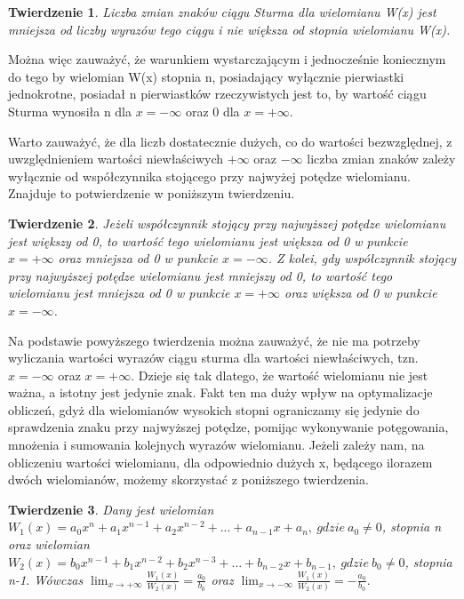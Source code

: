 \documentclass[twoside,a4paper]{book}
\newtheorem{theorem}{Twierdzenie}
\begin{document}
\begin{theorem}
	Liczba zmian znaków ciągu Sturma dla wielomianu W(x) jest mniejsza od liczby wyrazów tego ciągu i nie większa od stopnia wielomianu W(x).
\end{theorem}

Można więc zauważyć, że warunkiem wystarczającym i jednocześnie koniecznym do tego by wielomian W(x) stopnia n, posiadający wyłącznie pierwiastki jednokrotne, posiadał n pierwiastków rzeczywistych jest to, by wartość ciągu Sturma wynosiła n dla $x=-\infty$ oraz 0 dla $x=+\infty$. 

Warto zauważyć, że dla liczb dostatecznie dużych, co do wartości bezwzględnej, z uwzględnieniem wartości niewłaściwych $+\infty$ oraz $-\infty$ liczba zmian znaków zależy wyłącznie od współczynnika stojącego przy najwyżej potędze wielomianu. Znajduje to potwierdzenie w poniższym twierdzeniu.

\begin{theorem}
	Jeżeli współczynnik stojący przy najwyższej potędze wielomianu jest większy od 0, to wartość tego wielomianu jest większa od 0 w punkcie $x=+\infty$ oraz mniejsza od 0 w punkcie $x=-\infty$.
	Z kolei, gdy współczynnik stojący przy najwyższej potędze wielomianu jest mniejszy od 0, to wartość tego wielomianu jest mniejsza od 0 w punkcie $x=+\infty$ oraz większa od 0 w punkcie $x=-\infty$.
\end{theorem}

Na podstawie powyższego twierdzenia można zauważyć, że nie ma potrzeby wyliczania wartości wyrazów ciągu sturma dla wartości niewłaściwych, tzn. $x=-\infty$ oraz $x=+\infty.$ Dzieje się tak dlatego, że wartość wielomianu nie jest ważna, a istotny jest jedynie znak. Fakt ten ma duży wpływ na optymalizacje obliczeń, gdyż dla wielomianów wysokich stopni ograniczamy się jedynie do sprawdzenia znaku przy najwyższej potędze, pomijąc wykonywanie potęgowania, mnożenia i sumowania kolejnych wyrazów wielomianu.
Jeżeli zależy nam, na obliczeniu wartości wielomianu, dla odpowiednio dużych x, będącego ilorazem dwóch wielomianów, możemy skorzystać z poniższego twierdzenia.

\begin{theorem}
	Dany jest wielomian $W_1(x) = a_0x^n + a_1x^{n-1} + a_2x^{n-2} + ... + a_{n-1}x + a_n,\ gdzie \ a_0 \ne 0$, stopnia n oraz wielomian $W_2(x) = b_0x^{n-1} + b_1x^{n-2} + b_2x^{n-3} + ... + b_{n-2}x + b_{n-1},\ gdzie\ b_0 \ne 0$, stopnia n-1. Wówczas $\lim_{x \to +\infty}\frac{W_1(x)}{W_2(x)} = \frac{a_0}{b_0}$ oraz $\lim_{x \to -\infty}\frac{W_1(x)}{W_2(x)} = -\frac{a_0}{b_0}.$
\end{theorem}
\end{document}
